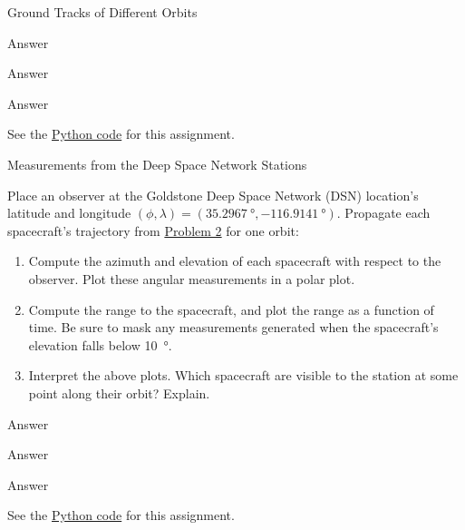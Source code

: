 \begin{hwkProblem}{3}{Ground Tracks of Different Orbits}
	\hwkSol{} \label{hwk:s03}

	\hwkPart{} \label{hwk:s03a}

	Answer

	\hwkPart{} \label{hwk:s03b}

	Answer

	\hwkPart{} \label{hwk:s03c}

	Answer

	\hwkCode{} \label{code:s03}

	See the \href{https://www.github.com/vaisriv/enae441-hw-template/blob/main/code/hw00.py}{Python code} for this assignment.

\end{hwkProblem}

\begin{hwkProblem}{4}{Measurements from the Deep Space Network Stations} \label{hwk:p04}

	Place an observer at the Goldstone Deep Space Network (DSN) location's latitude and longitude \( \left(\phi, \lambda\right)= \left(\qty{35.2967}{\degree},\qty{-116.9141}{\degree}\right) \). Propagate each spacecraft's trajectory from \hyperref[hwk:p02]{Problem 2} for one orbit:
	\begin{enumerate}
		\item \label{hwk:p04a} Compute the azimuth and elevation of each spacecraft with respect to the observer. Plot these angular measurements in a polar plot.
		\item \label{hwk:p04b} Compute the range to the spacecraft, and plot the range as a function of time. Be sure to mask any measurements generated when the spacecraft's elevation falls below \qty{10}{\degree}.
		\item \label{hwk:p04c} Interpret the above plots. Which spacecraft are visible to the station at some point along their orbit? Explain.
	\end{enumerate}

	\hwkSol{} \label{hwk:s04}

	\hwkPart{} \label{hwk:s04a}

	Answer

	\hwkPart{} \label{hwk:s04b}

	Answer

	\hwkPart{} \label{hwk:s04c}

	Answer

	\hwkCode{} \label{code:s04}

	See the \href{https://www.github.com/vaisriv/enae441-hw-template/blob/main/code/hw00.py}{Python code} for this assignment.

\end{hwkProblem}



